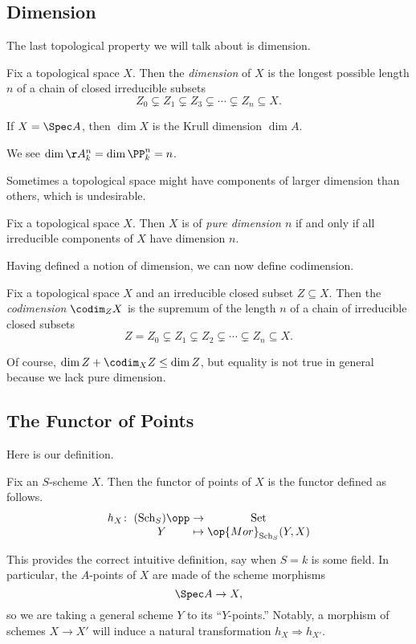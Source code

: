 \documentclass[../notes.tex]{subfiles}
\begin{document}
\subsection{Dimension}
The last topological property we will talk about is dimension.
\begin{definition}[Dimension]
	Fix a topological space $X$. Then the \textit{dimension} of $X$ is the longest possible length $n$ of a chain of closed irreducible subsets
	\[Z_0\subsetneq Z_1\subsetneq Z_3\subsetneq\cdots\subsetneq Z_n\subseteq X.\]
\end{definition}
\begin{example}
	If $X=\Spec A$, then $\dim X$ is the Krull dimension $\dim A$.
\end{example}
\begin{example}
	We see $\dim\AA^n_k=\dim\PP^n_k=n$.
\end{example}
Sometimes a topological space might have components of larger dimension than others, which is undesirable.
\begin{definition}
	Fix a topological space $X$. Then $X$ is of \textit{pure dimension $n$} if and only if all irreducible components of $X$ have dimension $n$.
\end{definition}
Having defined a notion of dimension, we can now define codimension.
\begin{definition}[Codimension]
	Fix a topological space $X$ and an irreducible closed subset $Z\subseteq X$. Then the \textit{codimension} $\codim_ZX$ is the supremum of the length $n$ of a chain of irreducible closed subsets
	\[Z=Z_0\subsetneq Z_1\subsetneq Z_2\subsetneq\cdots\subsetneq Z_n\subseteq X.\]
\end{definition}
\begin{remark}
	Of course, $\dim Z+\codim_XZ\le\dim Z$, but equality is not true in general because we lack pure dimension.
\end{remark}

\subsection{The Functor of Points}
Here is our definition.
\begin{definition}
	Fix an $S$-scheme $X$. Then the functor of points of $X$ is the functor defined as follows.
	\[\arraycolsep=1.4pt\begin{array}{cccccc}
		h_X\colon& (\mathrm{Sch}_S)\opp &\to& \mathrm{Set} \\
		& Y &\mapsto& \op{Mor}_{\mathrm{Sch}_S}(Y,X)
	\end{array}\]
\end{definition}
This provides the correct intuitive definition, say when $S=k$ is some field. In particular, the $A$-points of $X$ are made of the scheme morphisms
\[\Spec A\to X,\]
so we are taking a general scheme $Y$ to its ``$Y$-points.'' Notably, a morphism of schemes $X\to X'$ will induce a natural transformation $h_X\Rightarrow h_{X'}$.
\end{document}
